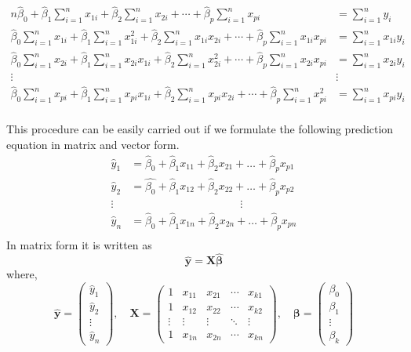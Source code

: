 \documentclass[twoside]{book}
\begin{document}
\begin{align*}
n\hat{\beta}_0
+ \hat{\beta}_1 \sum_{i=1}^n x_{1i}
+ \hat{\beta}_2 \sum_{i=1}^n x_{2i}
+ \cdots
+ \hat{\beta}_p \sum_{i=1}^n x_{pi}
&= \sum_{i=1}^n y_i \\[1ex]
%
\hat{\beta}_0 \sum_{i=1}^n x_{1i}
+ \hat{\beta}_1 \sum_{i=1}^n x_{1i}^2
+ \hat{\beta}_2 \sum_{i=1}^n x_{1i}x_{2i}
+ \cdots
+ \hat{\beta}_p \sum_{i=1}^n x_{1i}x_{pi}
&= \sum_{i=1}^n x_{1i}y_i \\[1ex]
%
\hat{\beta}_0 \sum_{i=1}^n x_{2i}
+ \hat{\beta}_1 \sum_{i=1}^n x_{2i}x_{1i}
+ \hat{\beta}_2 \sum_{i=1}^n x_{2i}^2
+ \cdots
+ \hat{\beta}_p \sum_{i=1}^n x_{2i}x_{pi}
&= \sum_{i=1}^n x_{2i}y_i \\
%
\vdots \hspace{10em} &\vdots \\[1ex]
%
\hat{\beta}_0 \sum_{i=1}^n x_{pi}
+ \hat{\beta}_1 \sum_{i=1}^n x_{pi}x_{1i}
+ \hat{\beta}_2 \sum_{i=1}^n x_{pi}x_{2i}
+ \cdots
+ \hat{\beta}_p \sum_{i=1}^n x_{pi}^2
&= \sum_{i=1}^n x_{pi}y_i \\
\end{align*}

This procedure can be easily carried out if we formulate the following prediction equation in matrix and vector form.
\begin{align*}
\hat{y}_1 &= \hat{\beta}_0 + \hat{\beta}_1x_{11} + \hat{\beta}_2x_{21} + \dots + \hat{\beta}_px_{p1}\\
\hat{y}_2 &= \hat{\beta_0} + \hat{\beta}_1x_{12} + \hat{\beta}_2x_{22} + \dots + \hat{\beta}_px_{p2}\\
\vdots &\hspace{10em} \vdots \\[1ex]
\hat{y}_n &= \hat{\beta}_0 + \hat{\beta}_1x_{1n} + \hat{\beta}_2x_{2n} + \dots + \hat{\beta}_px_{pn}\\
\end{align*}
In matrix form it is written as
$$\hat{\mathbf{y}} = \mathbf{X} \hat{\boldsymbol{\beta}}$$
where,
\begin{equation*}
\hat{\mathbf{y}} = \begin{pmatrix}
\hat{y}_1 \\
\hat{y}_2 \\
\vdots \\
\hat{y}_n
\end{pmatrix}, \quad
\mathbf{X} = \begin{pmatrix}
1 & x_{11} & x_{21} & \cdots & x_{k1} \\
1 & x_{12} & x_{22} & \cdots & x_{k2} \\
\vdots & \vdots & \vdots & \ddots & \vdots \\
1 & x_{1n} & x_{2n} & \cdots & x_{kn}
\end{pmatrix}, \quad
\boldsymbol{\beta} = \begin{pmatrix}
\beta_0 \\
\beta_1 \\
\vdots \\
\beta_k
\end{pmatrix}
\end{equation*}
\end{document}
